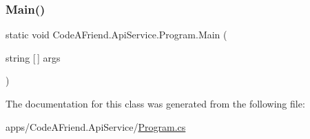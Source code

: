 \mbox{\label{class_code_a_friend_1_1_api_service_1_1_program_ab8576d734dee8553d034caa706a0d54c}} 
\subsubsection{\texorpdfstring{Main()}{Main()}}
{\footnotesize\ttfamily static void Code\+A\+Friend.\+Api\+Service.\+Program.\+Main (\begin{DoxyParamCaption}\item[{string \mbox{[}$\,$\mbox{]}}]{args }\end{DoxyParamCaption})\hspace{0.3cm}{\ttfamily [static]}}



The documentation for this class was generated from the following file\+:\begin{DoxyCompactItemize}
\item 
apps/\+Code\+A\+Friend.\+Api\+Service/\mbox{\hyperlink{_program_8cs}{Program.\+cs}}\end{DoxyCompactItemize}
